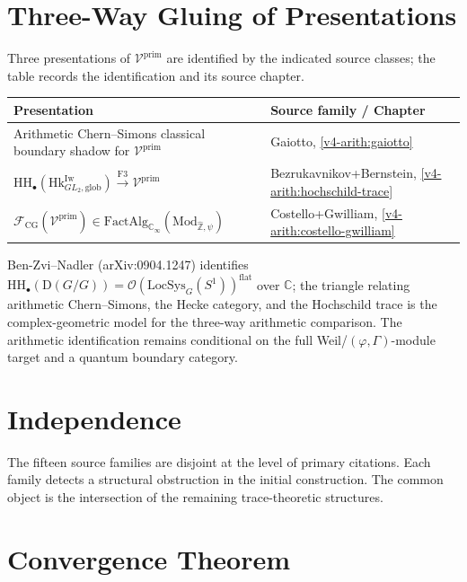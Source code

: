 \section{Three-Way Gluing of Presentations}
\label{v4-arith:app:B:three-way-gluing}

Three presentations of $\mathcal{V}^{\mathrm{prim}}$ are identified by
the indicated source classes; the table records the identification and
its source chapter.

\begin{center}
\begin{tabular}{l|l}
Presentation & Source family / Chapter \\
\hline
Arithmetic Chern--Simons classical boundary shadow for \(\mathcal{V}^{\mathrm{prim}}\) & Gaiotto, \ref{v4-arith:gaiotto} \\
\(\mathrm{HH}_{\bullet}(\mathrm{Hk}^{\mathrm{Iw}}_{GL_{2},\mathrm{glob}})\xrightarrow{\mathrm{F3}}\mathcal{V}^{\mathrm{prim}}\) & Bezrukavnikov+Bernstein, \ref{v4-arith:hochschild-trace} \\
\(\mathcal{F}_{\mathrm{CG}}(\mathcal{V}^{\mathrm{prim}})\in\mathrm{FactAlg}_{\mathbb{C}_{\infty}}(\mathrm{Mod}_{\widehat{\mathbb{Z}},\psi})\) & Costello+Gwilliam, \ref{v4-arith:costello-gwilliam}
\end{tabular}
\end{center}

Ben-Zvi--Nadler (arXiv:0904.1247) identifies
$\mathrm{HH}_{\bullet}(\mathrm{D}(G/G))=\mathcal{O}(\mathrm{LocSys}_{G}(S^{1}))^{\mathrm{flat}}$
over $\mathbb{C}$; the triangle relating arithmetic Chern--Simons,
the Hecke category, and the Hochschild trace is the
complex-geometric model for the three-way arithmetic comparison. The
arithmetic identification remains conditional on the full
Weil/$(\varphi,\Gamma)$-module target and a quantum boundary category.

\section{Independence}
\label{v4-arith:app:B:criterion-record}

The fifteen source families are disjoint at the level of primary
citations. Each family detects a structural obstruction in the initial
construction. The common object is the intersection of the remaining
trace-theoretic structures.

\section{Convergence Theorem}
\label{v4-arith:app:B:convergence-theorem}

